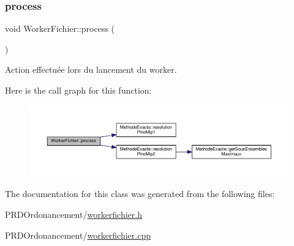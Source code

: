 \subsubsection{\texorpdfstring{process}{process}}
{\footnotesize\ttfamily void Worker\+Fichier\+::process (\begin{DoxyParamCaption}{ }\end{DoxyParamCaption})\hspace{0.3cm}{\ttfamily [slot]}}



Action effectuée lors du lancement du worker. 

Here is the call graph for this function\+:\nopagebreak
\begin{figure}[H]
\begin{center}
\leavevmode
\includegraphics[width=350pt]{classWorkerFichier_a3b72efa3a7e2de6f1a8001d999731e11_cgraph}
\end{center}
\end{figure}


The documentation for this class was generated from the following files\+:\begin{DoxyCompactItemize}
\item 
P\+R\+D\+Ordonancement/\hyperlink{workerfichier_8h}{workerfichier.\+h}\item 
P\+R\+D\+Ordonancement/\hyperlink{workerfichier_8cpp}{workerfichier.\+cpp}\end{DoxyCompactItemize}
